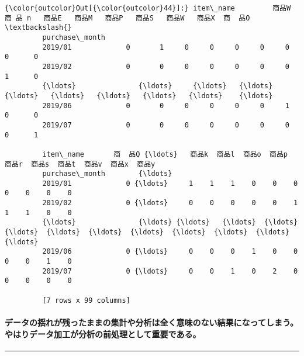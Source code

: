 \documentclass[11pt]{article}
\begin{document}
\begin{Verbatim}[commandchars=\\\{\}]
{\color{outcolor}Out[{\color{outcolor}44}]:} item\_name         商品W   商 品 n   商品E   商品M   商品P   商品S   商品W   商品X  商  品O  \textbackslash{}
         purchase\_month                                                             
         2019/01             0       1     0     0     0     0     0     0      0   
         2019/02             0       0     0     0     0     0     0     1      0   
         {\ldots}               {\ldots}     {\ldots}   {\ldots}   {\ldots}   {\ldots}   {\ldots}   {\ldots}   {\ldots}    {\ldots}   
         2019/06             0       0     0     0     0     0     1     0      0   
         2019/07             0       0     0     0     0     0     0     0      1   
         
         item\_name       商  品Q {\ldots}   商品k  商品l  商品o  商品p  商品r  商品s  商品t  商品v  商品x  商品y  
         purchase\_month        {\ldots}                                                     
         2019/01             0 {\ldots}     1    1    1    0    0    0    0    0    0    0  
         2019/02             0 {\ldots}     0    0    0    0    0    1    1    1    0    0  
         {\ldots}               {\ldots} {\ldots}   {\ldots}  {\ldots}  {\ldots}  {\ldots}  {\ldots}  {\ldots}  {\ldots}  {\ldots}  {\ldots}  {\ldots}  
         2019/06             0 {\ldots}     0    0    0    1    0    0    0    0    1    0  
         2019/07             0 {\ldots}     0    0    1    0    2    0    0    0    0    0  
         
         [7 rows x 99 columns]
\end{Verbatim}
            
    \paragraph{データの揺れが残ったままの集計や分析は全く意味のない結果になってしまう。やはりデータ加工が分析の前処理として重要である。}\label{ux30c7ux30fcux30bfux306eux63faux308cux304cux6b8bux3063ux305fux307eux307eux306eux96c6ux8a08ux3084ux5206ux6790ux306fux5168ux304fux610fux5473ux306eux306aux3044ux7d50ux679cux306bux306aux3063ux3066ux3057ux307eux3046ux3084ux306fux308aux30c7ux30fcux30bfux52a0ux5de5ux304cux5206ux6790ux306eux524dux51e6ux7406ux3068ux3057ux3066ux91cdux8981ux3067ux3042ux308b}

    \begin{center}\rule{0.5\linewidth}{\linethickness}\end{center}
\end{document}
